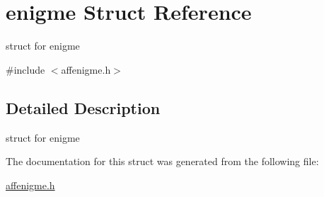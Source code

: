 \hypertarget{structenigme}{\section{enigme Struct Reference}
\label{structenigme}
}


struct for enigme  




{\ttfamily \#include $<$affenigme.\-h$>$}



\subsection{Detailed Description}
struct for enigme 

The documentation for this struct was generated from the following file\-:\begin{DoxyCompactItemize}
\item 
\hyperlink{affenigme_8h}{affenigme.\-h}\end{DoxyCompactItemize}
